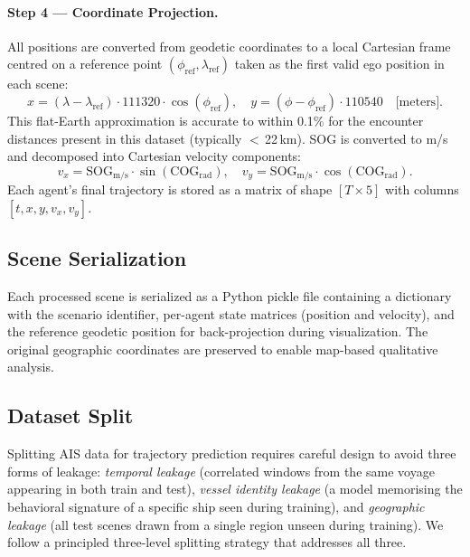\documentclass[12pt, a4paper]{article}
\begin{document}
  \paragraph{Step 4 --- Coordinate Projection.}
  All positions are converted from geodetic coordinates to a local Cartesian frame centred on a reference point $(\phi_{\text{ref}}, \lambda_{\text{ref}})$ taken as the first valid ego position in each scene:
  \begin{equation}
      x = (\lambda - \lambda_{\text{ref}}) \cdot 111320 \cdot \cos(\phi_{\text{ref}}), \quad
      y = (\phi   - \phi_{\text{ref}})   \cdot 110540
      \quad \text{[meters]}.
      \label{eq:projection}
  \end{equation}
  This flat-Earth approximation is accurate to within 0.1\% for the encounter distances present in this dataset (typically $<$\,22\,km). SOG is converted to m/s and decomposed into Cartesian velocity components:
  \begin{equation}
      v_x = \text{SOG}_{\text{m/s}} \cdot \sin(\text{COG}_{\text{rad}}), \quad
      v_y = \text{SOG}_{\text{m/s}} \cdot \cos(\text{COG}_{\text{rad}}).
  \end{equation}
  Each agent's final trajectory is stored as a matrix of shape $[T \times 5]$
  with columns $[t, x, y, v_x, v_y]$.

  \subsection{Scene Serialization}

  Each processed scene is serialized as a Python pickle file containing a dictionary with the scenario identifier, per-agent state matrices (position and velocity), and the reference geodetic position for
  back-projection during visualization. The original geographic coordinates are preserved to enable map-based qualitative analysis.

  \subsection{Dataset Split}

  Splitting AIS data for trajectory prediction requires careful design to avoid three
  forms of leakage: \emph{temporal leakage} (correlated windows from the same voyage
  appearing in both train and test), \emph{vessel identity leakage} (a model memorising
  the behavioral signature of a specific ship seen during training), and
  \emph{geographic leakage} (all test scenes drawn from a single region unseen during
  training).  We follow a principled three-level splitting strategy that addresses all
  three.
\end{document}
